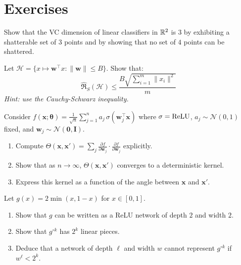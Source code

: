 \section{Exercises}
\label{sec:theory-exercises}

\begin{exercise}
\label{exo:vc-dim}
Show that the VC dimension of linear classifiers in $\mathbb{R}^2$
is $3$ by exhibiting a shatterable set of $3$ points and by
showing that no set of $4$ points can be shattered.
\end{exercise}

\begin{exercise}
\label{exo:rademacher}
Let $\mathcal{H} = \{x \mapsto \mathbf{w}^\top x : \|\mathbf{w}\| \leq B\}$.
Show that:
\begin{equation}
\hat{\mathfrak{R}}_S(\mathcal{H}) \leq \frac{B\sqrt{\sum_{i=1}^{m}\|x_i\|^2}}{m}
\end{equation}
\textit{Hint: use the Cauchy-Schwarz inequality.}
\end{exercise}

\begin{exercise}
\label{exo:ntk-one-layer}
Consider $f(\mathbf{x}; \boldsymbol{\theta}) = \frac{1}{\sqrt{n}}\sum_{j=1}^{n} a_j\,\sigma(\mathbf{w}_j^\top \mathbf{x})$
where $\sigma = \mathrm{ReLU}$, $a_j \sim \mathcal{N}(0, 1)$ fixed, and
$\mathbf{w}_j \sim \mathcal{N}(\mathbf{0}, \mathbf{I})$.
\begin{enumerate}
    \item Compute $\Theta(\mathbf{x}, \mathbf{x}') = \sum_j \frac{\partial f}{\partial \mathbf{w}_j} \cdot \frac{\partial f}{\partial \mathbf{w}_j}$ explicitly.
    \item Show that as $n \to \infty$, $\Theta(\mathbf{x}, \mathbf{x}')$ converges to a deterministic kernel.
    \item Express this kernel as a function of the angle between $\mathbf{x}$ and $\mathbf{x}'$.
\end{enumerate}
\end{exercise}

\begin{exercise}
\label{exo:depth-separation}
Let $g(x) = 2\min(x, 1-x)$ for $x \in [0,1]$.
\begin{enumerate}
    \item Show that $g$ can be written as a ReLU network of depth
          $2$ and width $2$.
    \item Show that $g^{\circ k}$ has $2^k$ linear pieces.
    \item Deduce that a network of depth $\ell$ and width $w$
          cannot represent $g^{\circ k}$ if $w^\ell < 2^k$.
\end{enumerate}
\end{exercise}

